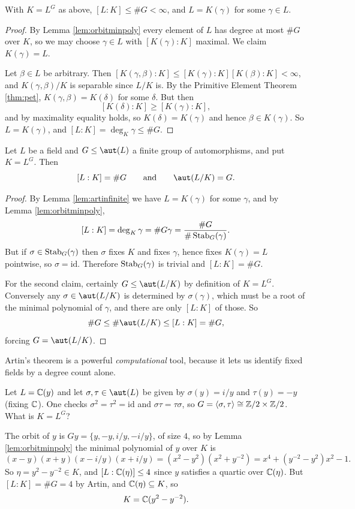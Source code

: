 \documentclass[a4paper]{scrartcl}
\begin{document}
\begin{lemma}\label{lem:artinfinite}
	With $K = L^G$ as above, $[L:K] \leq \#G < \infty$, and $L = K(\gamma)$ for some $\gamma \in L$.
\end{lemma}

\begin{proof}
	By Lemma \ref{lem:orbitminpoly} every element of $L$ has degree at most $\#G$ over $K$, so we may choose $\gamma \in L$ with $[K(\gamma):K]$ maximal. We claim $K(\gamma) = L$.

	Let $\beta \in L$ be arbitrary. Then $[K(\gamma,\beta):K] \leq [K(\gamma):K][K(\beta):K] < \infty$, and $K(\gamma,\beta)/K$ is separable since $L/K$ is. By the Primitive Element Theorem \ref{thm:pet}, $K(\gamma,\beta) = K(\delta)$ for some $\delta$. But then
	$$[K(\delta):K] \geq [K(\gamma):K],$$
	and by maximality equality holds, so $K(\delta) = K(\gamma)$ and hence $\beta \in K(\gamma)$. So $L = K(\gamma)$, and $[L:K] = \deg_K\gamma \leq \#G$.
\end{proof}

\begin{theorem}[Artin]\label{thm:artin}
	Let $L$ be a field and $G \leq \aut(L)$ a finite group of automorphisms, and put $K = L^G$. Then
	$$[L : K] = \#G \qquad\text{and}\qquad \aut(L/K) = G.$$
\end{theorem}

\begin{proof}
	By Lemma \ref{lem:artinfinite} we have $L = K(\gamma)$ for some $\gamma$, and by Lemma \ref{lem:orbitminpoly},
	$$[L:K] = \deg_K \gamma = \#G\gamma = \frac{\#G}{\#\operatorname{Stab}_G(\gamma)}.$$
	But if $\sigma \in \operatorname{Stab}_G(\gamma)$ then $\sigma$ fixes $K$ and fixes $\gamma$, hence fixes $K(\gamma) = L$ pointwise, so $\sigma = \mathrm{id}$. Therefore $\operatorname{Stab}_G(\gamma)$ is trivial and $[L:K] = \#G$.

	For the second claim, certainly $G \leq \aut(L/K)$ by definition of $K = L^G$. Conversely any $\sigma \in \aut(L/K)$ is determined by $\sigma(\gamma)$, which must be a root of the minimal polynomial of $\gamma$, and there are only $[L:K]$ of those. So
	$$\#G \leq \#\aut(L/K) \leq [L:K] = \#G,$$
	forcing $G = \aut(L/K)$.
\end{proof}

Artin's theorem is a powerful \emph{computational} tool, because it lets us identify fixed fields by a degree count alone.

\begin{example}
	Let $L = \mathbb{C}(y)$ and let $\sigma, \tau \in \aut(L)$ be given by $\sigma(y) = i/y$ and $\tau(y) = -y$ (fixing $\mathbb{C}$). One checks $\sigma^2 = \tau^2 = \mathrm{id}$ and $\sigma\tau = \tau\sigma$, so $G = \langle \sigma,\tau\rangle \cong \mathbb{Z}/2\times\mathbb{Z}/2$. What is $K = L^G$?

	The orbit of $y$ is $Gy = \{y, -y, i/y, -i/y\}$, of size $4$, so by Lemma \ref{lem:orbitminpoly} the minimal polynomial of $y$ over $K$ is
	$$(x-y)(x+y)(x - i/y)(x+i/y) = (x^2-y^2)(x^2 + y^{-2}) = x^4 + (y^{-2} - y^2)x^2 - 1.$$
	So $\eta = y^2 - y^{-2} \in K$, and $[L : \mathbb{C}(\eta)] \leq 4$ since $y$ satisfies a quartic over $\mathbb{C}(\eta)$. But $[L:K] = \#G = 4$ by Artin, and $\mathbb{C}(\eta) \subseteq K$, so
	$$K = \mathbb{C}(y^2 - y^{-2}).$$
\end{example}
\end{document}

